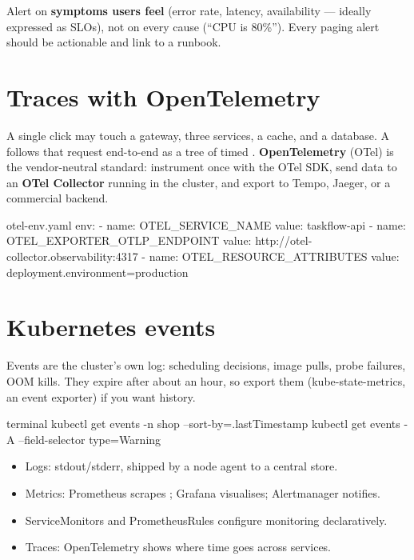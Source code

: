 \begin{protip}
Alert on \textbf{symptoms users feel} (error rate, latency, availability ---
ideally expressed as SLOs), not on every cause (``CPU is 80\%''). Every paging
alert should be actionable and link to a runbook.
\end{protip}

\section{Traces with OpenTelemetry}

A single click may touch a gateway, three services, a cache, and a database. A
 follows that request end-to-end as a tree of timed
. \textbf{OpenTelemetry} (OTel) is the vendor-neutral standard:
instrument once with the OTel SDK, send data to an \textbf{OTel Collector}
running in the cluster, and export to Tempo, Jaeger, or a commercial backend.

\begin{yamlcode}{otel-env.yaml}
env:
  - name: OTEL_SERVICE_NAME
    value: taskflow-api
  - name: OTEL_EXPORTER_OTLP_ENDPOINT
    value: http://otel-collector.observability:4317
  - name: OTEL_RESOURCE_ATTRIBUTES
    value: deployment.environment=production
\end{yamlcode}

\section{Kubernetes events}

Events are the cluster's own log: scheduling decisions, image pulls, probe
failures, OOM kills. They expire after about an hour, so export them
(kube-state-metrics, an event exporter) if you want history.

\begin{bashcode}{terminal}
kubectl get events -n shop --sort-by=.lastTimestamp
kubectl get events -A --field-selector type=Warning
\end{bashcode}

\begin{recap}
\begin{itemize}
  \item Logs: stdout/stderr, shipped by a node agent to a central store.
  \item Metrics: Prometheus scrapes ; Grafana visualises; Alertmanager notifies.
  \item ServiceMonitors and PrometheusRules configure monitoring declaratively.
  \item Traces: OpenTelemetry shows where time goes across services.
\end{itemize}
\end{recap}
